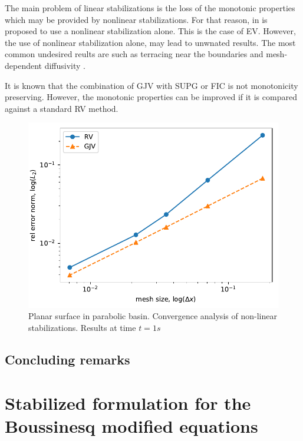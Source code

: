 The main problem of linear stabilizations is the loss of the monotonic properties which may be provided by nonlinear stabilizations. For that reason, in \cite{guermond2011} is proposed to use a nonlinear stabilization alone. This is the case of EV.
However, the use of nonlinear stabilization alone, may lead to unwnated results. The most common undesired reults are such as terracing near the boundaries \cite{lohner2008ch9,kuzmin2005b} and mesh-dependent diffusivity \cite{badia2014}.

It is known that the combination of GJV with SUPG or FIC is not monotonicity preserving. However, the monotonic properties can be improved if it is compared against a standard RV method.







\begin{figure}
    \centering
    \includegraphics[width=.7\textwidth]{img/eulerian/gjv/gjv_rv_parabola_convergence.pdf}
    \caption{Planar surface in parabolic basin. Convergence analysis of non-linear stabilizations. Results at time $t=1s$}
    \label{gjv_rv_parabola_converence}
\end{figure}



\subsection{Concluding remarks}











\section{Stabilized formulation for the Boussinesq modified equations}




